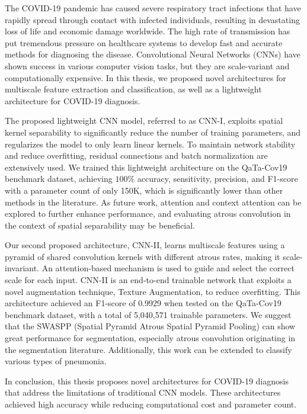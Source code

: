 The COVID-19 pandemic has caused severe respiratory tract infections that have rapidly spread through contact with infected individuals, resulting in devastating loss of life and economic damage worldwide. The high rate of transmission has put tremendous pressure on healthcare systems to develop fast and accurate methods for diagnosing the disease. Convolutional Neural Networks (CNNs) have shown success in various computer vision tasks, but they are scale-variant and computationally expensive. In this thesis, we proposed novel architectures for multiscale feature extraction and classification, as well as a lightweight architecture for COVID-19 diagnosis.

The proposed lightweight CNN model, referred to as CNN-I, exploits spatial kernel separability to significantly reduce the number of training parameters, and regularizes the model to only learn linear kernels. To maintain network stability and reduce overfitting, residual connections and batch normalization are extensively used. We trained this lightweight architecture on the QaTa-Cov19 benchmark dataset, achieving $100\%$ accuracy, sensitivity, precision, and F1-score with a parameter count of only 150K, which is significantly lower than other methods in the literature. As future work, attention and context attention can be explored to further enhance performance, and evaluating atrous convolution in the context of spatial separability may be beneficial.

Our second proposed architecture, CNN-II, learns multiscale features using a pyramid of shared convolution kernels with different atrous rates, making it scale-invariant. An attention-based mechanism is used to guide and select the correct scale for each input. CNN-II is an end-to-end trainable network that exploits a novel augmentation technique, Texture Augmentation, to reduce overfitting. This architecture achieved an F1-score of 0.9929 when tested on the QaTa-Cov19 benchmark dataset, with a total of 5,040,571 trainable parameters. We suggest that the SWASPP (Spatial Pyramid Atrous Spatial Pyramid Pooling) can show great performance for segmentation, especially atrous convolution originating in the segmentation literature. Additionally, this work can be extended to classify various types of pneumonia.

In conclusion, this thesis proposes novel architectures for COVID-19 diagnosis that address the limitations of traditional CNN models. These architectures achieved high accuracy while reducing computational cost and parameter count.

